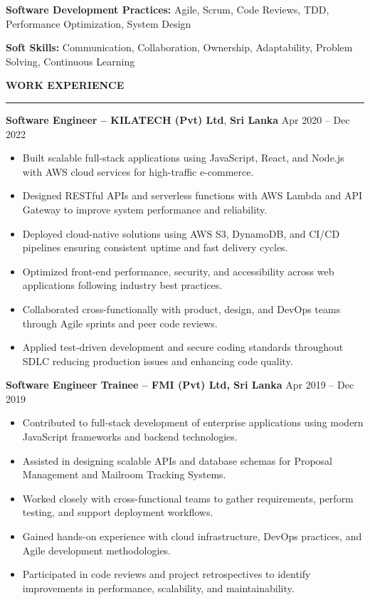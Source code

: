 \documentclass[10pt,letterpaper]{article}
\begin{document}
\textbf{Software Development Practices:} Agile, Scrum, Code Reviews, TDD, Performance Optimization, System Design

\textbf{Soft Skills:} Communication, Collaboration, Ownership, Adaptability, Problem Solving, Continuous Learning

\vspace{8pt}

\textbf{WORK EXPERIENCE}\\[-8pt]
\noindent\rule{\textwidth}{1pt}

\vspace{-2pt}

\textbf{Software Engineer -- KILATECH (Pvt) Ltd}, \textbf{Sri Lanka} \hfill Apr 2020 -- Dec 2022

\vspace{-1pt}

\begin{itemize}
\item Built scalable full-stack applications using JavaScript, React, and Node.js with AWS cloud services for high-traffic e-commerce.
\item Designed RESTful APIs and serverless functions with AWS Lambda and API Gateway to improve system performance and reliability.
\item Deployed cloud-native solutions using AWS S3, DynamoDB, and CI/CD pipelines ensuring consistent uptime and fast delivery cycles.
\item Optimized front-end performance, security, and accessibility across web applications following industry best practices.
\item Collaborated cross-functionally with product, design, and DevOps teams through Agile sprints and peer code reviews.
\item Applied test-driven development and secure coding standards throughout SDLC reducing production issues and enhancing code quality.
\end{itemize}

\textbf{Software Engineer Trainee -- FMI (Pvt) Ltd, Sri Lanka} \hfill Apr 2019 -- Dec 2019

\vspace{-1pt}

\begin{itemize}
\item Contributed to full-stack development of enterprise applications using modern JavaScript frameworks and backend technologies.
\item Assisted in designing scalable APIs and database schemas for Proposal Management and Mailroom Tracking Systems.
\item Worked closely with cross-functional teams to gather requirements, perform testing, and support deployment workflows.
\item Gained hands-on experience with cloud infrastructure, DevOps practices, and Agile development methodologies.
\item Participated in code reviews and project retrospectives to identify improvements in performance, scalability, and maintainability.
\end{itemize}
\end{document}
